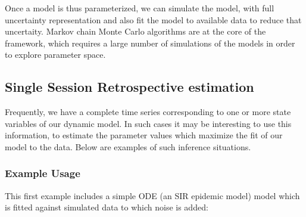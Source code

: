\documentclass[a4paper,10pt,english]{manual}
\begin{document}
Once a model is thus parameterized, we can simulate the model, with full uncertainty representation and also fit the model to available data to reduce that uncertaity. Markov chain Monte Carlo algorithms are at the core of the framework, which requires a large number of simulations of the models in order to explore parameter space.


\subsection{Single Session Retrospective estimation}

Frequently, we have a complete time series corresponding to one or more state variables of our dynamic model. In such cases it may be interesting to use this information, to estimate the parameter values which maximize the fit of our model to the data. Below are examples of such inference situations.


\subsubsection{Example Usage}

This first example includes a simple ODE (an SIR epidemic model) model which is fitted against simulated data to which noise is added:
\end{document}
